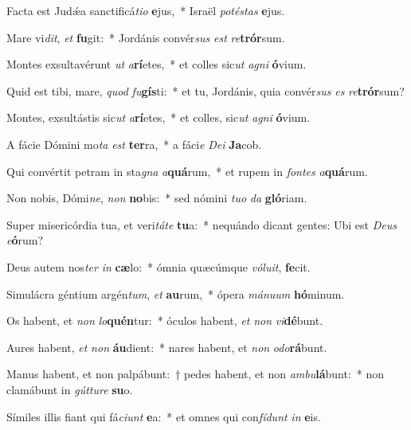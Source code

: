\item Facta est Judǽa sanctificá\textit{ti}\textit{o} \textbf{e}jus,~* Israël \textit{pot}\textit{és}\textit{tas} \textbf{e}jus.
\item Mare vi\textit{dit}, \textit{et} \textbf{fu}git:~* Jordánis convér\textit{sus} \textit{est} \textit{re}\textbf{trór}sum.
\item Montes exsultavérunt \textit{ut} \textit{a}\textbf{rí}etes,~* et colles sic\textit{ut} \textit{a}\textit{gni} \textbf{ó}vium.
\item Quid est tibi, mare, \textit{quod} \textit{fu}\textbf{gís}ti:~* et tu, Jordánis, quia convér\textit{sus} \textit{es} \textit{re}\textbf{trór}sum?
\item Montes, exsultástis sic\textit{ut} \textit{a}\textbf{rí}etes,~* et colles, sic\textit{ut} \textit{a}\textit{gni} \textbf{ó}vium.
\item A fácie Dómini mo\textit{ta} \textit{est} \textbf{ter}ra,~* a fáci\textit{e} \textit{De}\textit{i} \textbf{Ja}cob.
\item Qui convértit petram in sta\textit{gna} \textit{a}\textbf{quá}rum,~* et rupem in \textit{fon}\textit{tes} \textit{a}\textbf{quá}rum.
\item Non nobis, Dómi\textit{ne}, \textit{non} \textbf{no}bis:~* sed nómini \textit{tu}\textit{o} \textit{da} \textbf{gló}riam.
\item Super misericórdia tua, et veri\textit{tá}\textit{te} \textbf{tu}a:~* nequándo dicant gentes: Ubi est \textit{De}\textit{us} \textit{e}\textbf{ó}rum?
\item Deus autem nos\textit{ter} \textit{in} \textbf{cæ}lo:~* ómnia quæcúmque \textit{vó}\textit{lu}\textit{it}, \textbf{fe}cit.
\item Simulácra géntium argén\textit{tum}, \textit{et} \textbf{au}rum,~* ópera \textit{má}\textit{nu}\textit{um} \textbf{hó}minum.
\item Os habent, et \textit{non} \textit{lo}\textbf{quén}tur:~* óculos habent, \textit{et} \textit{non} \textit{vi}\textbf{dé}bunt.
\item Aures habent, \textit{et} \textit{non} \textbf{áu}dient:~* nares habent, et \textit{non} \textit{o}\textit{do}\textbf{rá}bunt.
\item Manus habent, et non palpábunt:~† pedes habent, et non \textit{am}\textit{bu}\textbf{lá}bunt:~* non clamábunt in \textit{gút}\textit{tu}\textit{re} \textbf{su}o.
\item Símiles illis fiant qui fá\textit{ci}\textit{unt} \textbf{e}a:~* et omnes qui con\textit{fí}\textit{dunt} \textit{in} \textbf{e}is.
